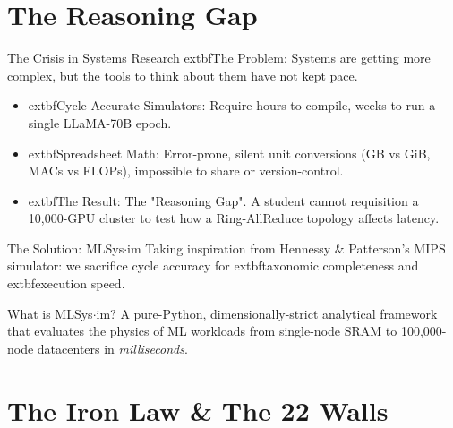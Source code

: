 \documentclass[aspectratio=169, 10pt]{beamer}
\subtitle{From the Iron Law of Performance to Agentic Infrastructure Design}
\author{Machine Learning Systems Textbook Team}
\date{ISCA / ASPLOS / MLSys Tutorial}
\begin{document}
\maketitle

\section{The Reasoning Gap}

\begin{frame}{The Crisis in Systems Research}
    	extbf{The Problem:} Systems are getting more complex, but the tools to think about them have not kept pace.
    \vspace{0.5cm}
    
    \begin{itemize}
        \item 	extbf{Cycle-Accurate Simulators:} Require hours to compile, weeks to run a single LLaMA-70B epoch.
        \item 	extbf{Spreadsheet Math:} Error-prone, silent unit conversions (GB vs GiB, MACs vs FLOPs), impossible to share or version-control.
        \item 	extbf{The Result:} The "Reasoning Gap". A student cannot requisition a 10,000-GPU cluster to test how a Ring-AllReduce topology affects latency.
    \end{itemize}
\end{frame}

\begin{frame}{The Solution: MLSys$\cdot$im}
    Taking inspiration from Hennessy \& Patterson's MIPS simulator: we sacrifice cycle accuracy for 	extbf{taxonomic completeness} and 	extbf{execution speed}.
    \vspace{0.5cm}
    
    \begin{block}{What is MLSys$\cdot$im?}
        A pure-Python, dimensionally-strict analytical framework that evaluates the physics of ML workloads from single-node SRAM to 100,000-node datacenters in \emph{milliseconds}.
    \end{block}
\end{frame}

\section{The Iron Law \& The 22 Walls}
\end{document}
